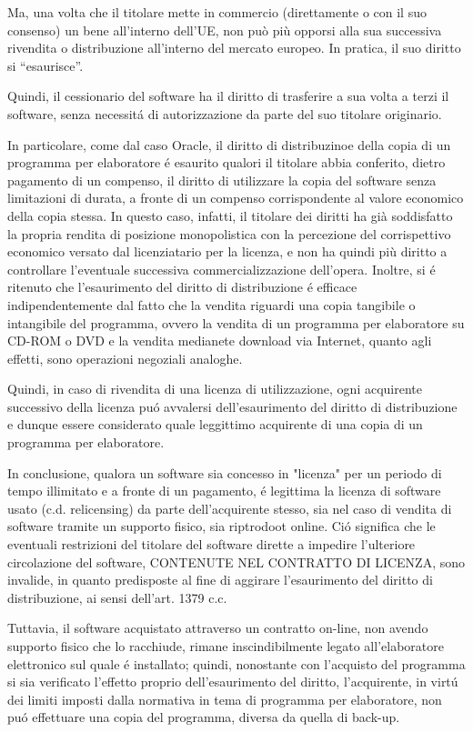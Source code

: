 \documentclass{article}
\begin{document}
Ma, una volta che il titolare mette in commercio (direttamente o con il suo consenso) un bene all’interno dell’UE, non può più opporsi alla sua successiva rivendita o distribuzione all’interno del mercato europeo. In pratica, il suo diritto si “esaurisce”.

Quindi, il cessionario del software ha il diritto di trasferire a sua volta a terzi il software, senza necessit\'a di autorizzazione da parte del suo titolare originario.

In particolare, come dal caso Oracle, il diritto di distribuzinoe della copia di un programma per elaboratore \'e esaurito qualori il titolare abbia conferito, dietro pagamento di un compenso, il diritto di utilizzare la copia del software senza limitazioni di durata, a fronte di un compenso corrispondente al valore economico della copia stessa.  In questo caso, infatti, il titolare dei diritti ha già soddisfatto la propria rendita di posizione monopolistica con la percezione del corrispettivo economico versato dal licenziatario per la licenza, e non ha quindi più diritto a controllare l’eventuale successiva commercializzazione dell’opera. Inoltre, si \'e ritenuto che l'esaurimento del diritto di distribuzione \'e efficace indipendentemente dal fatto che la vendita riguardi una copia tangibile o intangibile del programma, ovvero la vendita di un programma per elaboratore su CD-ROM o DVD e la vendita medianete download via Internet, quanto agli effetti, sono operazioni negoziali analoghe. 

Quindi, in caso di rivendita di una licenza di utilizzazione, ogni acquirente successivo della licenza pu\'o avvalersi dell'esaurimento del diritto di distribuzione e dunque essere considerato quale leggittimo acquirente di una copia di un programma per elaboratore. 

In conclusione, qualora un software sia concesso in "licenza" per un periodo di tempo illimitato e a fronte di un pagamento, \'e legittima la licenza di software usato (c.d. relicensing) da parte dell'acquirente stesso, sia nel caso di vendita di software tramite un supporto fisico, sia riptrodoot online. Ci\'o significa che le eventuali restrizioni del titolare del software dirette a impedire l'ulteriore circolazione del software, CONTENUTE NEL CONTRATTO DI LICENZA, sono invalide, in quanto predisposte al fine di aggirare l'esaurimento del diritto di distribuzione, ai sensi dell'art. 1379 c.c.

Tuttavia, il software acquistato attraverso un contratto on-line, non avendo supporto fisico che lo racchiude, rimane inscindibilmente legato all'elaboratore elettronico sul quale \'e installato; quindi, nonostante con l'acquisto del programma si sia verificato l'effetto proprio dell'esaurimento del diritto, l'acquirente, in virt\'u dei limiti imposti dalla normativa in tema di programma per elaboratore, non pu\'o effettuare una copia del programma, diversa da quella di back-up. 
\end{document}

